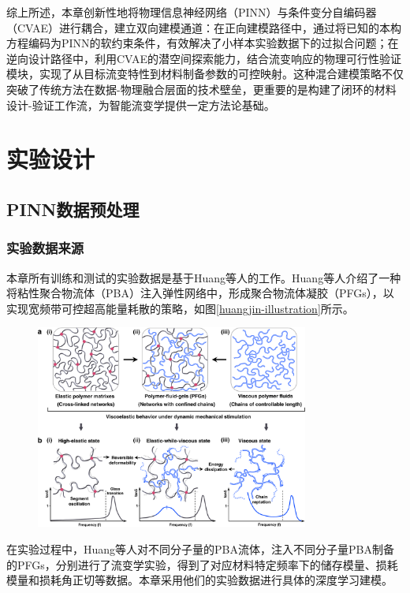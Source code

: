 综上所述，本章创新性地将物理信息神经网络（PINN）与条件变分自编码器（CVAE）进行耦合，建立双向建模通道：在正向建模路径中，通过将已知的本构方程编码为PINN的软约束条件，有效解决了小样本实验数据下的过拟合问题；在逆向设计路径中，利用CVAE的潜空间探索能力，结合流变响应的物理可行性验证模块，实现了从目标流变特性到材料制备参数的可控映射。这种混合建模策略不仅突破了传统方法在数据-物理融合层面的技术壁垒，更重要的是构建了闭环的材料设计-验证工作流，为智能流变学提供一定方法论基础。
\section{实验设计}
\subsection{PINN数据预处理}
\subsubsection{实验数据来源}
本章所有训练和测试的实验数据是基于Huang等人的工作\cite{huangUltrahighEnergydissipationElastomers2021}。Huang等人介绍了一种将粘性聚合物流体（PBA）注入弹性网络中，形成聚合物流体凝胶（PFGs），以实现宽频带可控超高能量耗散的策略，如图\ref{huangjin-illustration}所示。
\begin{figure}[htbp]
  \centering
  \includegraphics[width=0.8\textwidth]{Fig/huangjin.png}
\end{figure}
在实验过程中，Huang等人对不同分子量的PBA流体，注入不同分子量PBA制备的PFGs，分别进行了流变学实验，得到了对应材料特定频率下的储存模量、损耗模量和损耗角正切等数据。本章采用他们的实验数据进行具体的深度学习建模。

